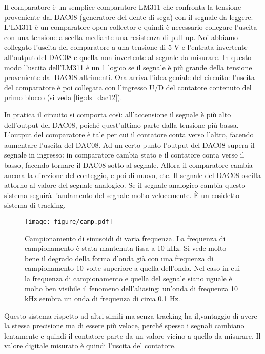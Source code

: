 Il comparatore è un semplice comparatore LM311 che confronta la tensione proveniente dal DAC08 (generatore del dente di sega)
con il segnale da leggere. L'LM311 è un comparatore open-collector e quindi è necessario collegare l'uscita con
una tensione a scelta mediante una resistenza di pull-up. Noi abbiamo collegato l'uscita del comparatore a una tensione 
di 5 V e l'entrata invertente all'output del DAC08 e quella non invertente al segnale da misurare.
In questo modo l'uscita dell'LM311 è un 1 logico se il segnale è più grande della tensione proveniente dal DAC08
altrimenti. Ora arriva l'idea geniale del circuito: l'uscita del comparatore è poi collegata con l'ingresso
U/D del contatore contenuto del primo blocco (si veda \ref{fig:ds_dac12}).

In pratica il circuito si comporta così: all'accensione il segnale è più alto dell'output del DAC08,
poiché quest'ultimo parte dalla tensione più bassa. L'output del comparatore è tale per cui il contatore
conta verso l'altro, facendo aumentare l'uscita del DAC08. Ad un certo punto l'output del DAC08 supera il
segnale in ingresso: in comparatore cambia stato e il contatore conta verso il basso, facendo tornare il
DAC08 sotto al segnale. Allora il comparatore cambia ancora la direzione del conteggio, e poi di nuovo, etc.
Il segnale del DAC08 oscilla attorno al valore del segnale analogico. Se il segnale analogico cambia questo
sistema seguirà l'andamento del segnale molto velocemente. È un cosidetto sistema di tracking.

\begin{figure*}[b]
    \centering
    \texttt{[image: figure/camp.pdf]}
    \caption{Campionamento di sinusoidi di varia frequenza. La frequenza di
        campionamento è stata mantenuta fissa a 10 kHz. Si vede molto bene il degrado
        della forma d'onda già con una frequenza di campionamento 10 volte superiore
        a quella dell'onda. Nel caso in cui la frequenza di campionamento
        e quella del segnale siano uguale è molto ben visibile il fenomeno
        dell'aliasing: un'onda di frequenza 10 kHz sembra un onda di frequenza
        di circa 0.1 Hz.}
    \label{fig:camp13}
\end{figure*}

Questo sistema rispetto ad altri simili ma senza tracking ha il,vantaggio di avere la stessa precisione
ma di essere più veloce, perché spesso i segnali cambiano lentamente e quindi il contatore parte da un valore vicino
a quello da misurare. Il valore digitale misurato è quindi l'uscita del contatore.

